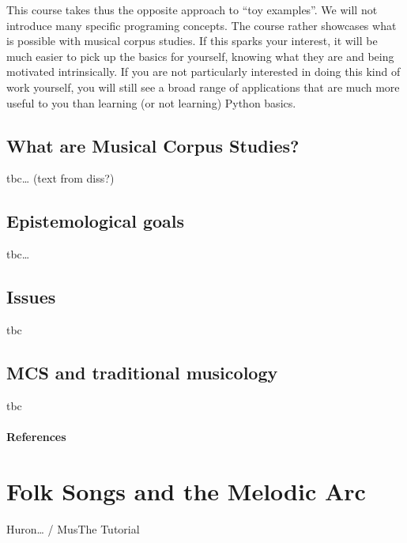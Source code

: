 \documentclass[letterpaper,10pt,english]{sphinxmanual}
\begin{document}
This course takes thus the opposite approach to “toy examples”. We will not introduce many specific
programing concepts. The course rather showcases what is possible with musical corpus studies.
If this sparks your interest, it will be much easier to pick up the basics for yourself,
knowing what they are  and being motivated intrinsically.
If you are not particularly interested in doing this kind of work yourself,
you will still see a broad range of applications that are much more useful to you than
learning (or not learning) Python basics.


\section{What are Musical Corpus Studies?}
\label{\detokenize{2_introduction:what-are-musical-corpus-studies}}
tbc… (text from diss?)


\section{Epistemological goals}
\label{\detokenize{2_introduction:epistemological-goals}}
tbc…


\section{Issues}
\label{\detokenize{2_introduction:issues}}
tbc 


\section{MCS and traditional musicology}
\label{\detokenize{2_introduction:mcs-and-traditional-musicology}}
tbc
\subsubsection*{References}




\chapter{Folk Songs and the Melodic Arc}
\label{\detokenize{3_folk_songs:folk-songs-and-the-melodic-arc}}\label{\detokenize{3_folk_songs::doc}}
Huron… / MusThe Tutorial
\end{document}
